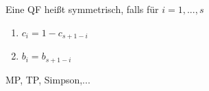 \begin{comment}
Zu vergebenen paarweise verschiedenen Knoten $c_1, ..., c_s$ lässt sich aus (*) für $p=s$ ein lineares Gleichungssystem für die Gewichte $b_1, ..., b_s$ aufstellen.\\

$$
\underbrace{\left[ \begin{array}{rrrr}
1 & 1 & ... & 1 \\
c_1 & c_2 & ... & c_s \\
... & ... & ... & ... \\
c_1^{s-1} & c_2^{s-1} & ... & c_s^{s-1} \\
\end{array}\right]}_{= V}
*
\left[ \begin{array}{r}
b_1 \\
b_2 \\
... \\
b_s \\
\end{array}\right] 
= 
\left[ \begin{array}{r}
1 \\
1/2 \\
... \\
1/s \\
\end{array}\right] 
$$
Falls die Vandermonde-Matrix V invertierbar ist, so lassen sich die Gewichte $b_1, ..., b_s$ bestimmen, sodass die QF $(b_i, c_i)_{i = 1}^{s}$ mindestens Ordnung $s$ hat.
\end{comment}

\begin{definition}
Eine QF heißt symmetrisch, falls für $i = 1,...,s$
\begin{enumerate}
  \item $c_i = 1 - c_{s+1-i}$
  \item $b_i = b_{s+1-i}$
\end{enumerate}
\end{definition}

\begin{example}
MP, TP, Simpson,...
\end{example}

